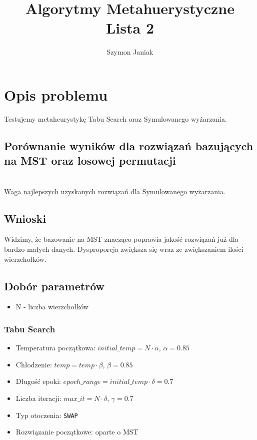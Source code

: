\documentclass{article}
\title{%
	Algorytmy Metahuerystyczne \\
	\large Lista 2}
\author{Szymon Janiak}
\begin{document}
\maketitle

\section*{Opis problemu}
	Testujemy metaheurystykę Tabu Search oraz Symulowanego wyżarzania.

\subsection*{Porównanie wyników dla rozwiązań bazujących na MST oraz losowej permutacji}
    \begin{center}
		\\Waga najlepszych uzyskanych rozwiązań dla Symulowanego wyżarzania.
    \end{center}
\subsection*{Wnioski}
	Widzimy, że bazowanie na MST znacząco poprawia jakość rozwiązań już dla bardzo małych danych. Dysproporcja zwiększa się wraz ze zwiększaniem ilości wierzchołków.

\subsection*{Dobór parametrów}
	\begin{itemize}
		\item N - liczba wierzchołków
	\end{itemize}
\subsubsection*{Tabu Search}
	\begin{itemize}
		\item Temperatura początkowa: $initial\_temp = N \cdot \alpha$, $\alpha = 0.85$
		\item Chłodzenie: $temp = temp \cdot \beta $, $\beta = 0.85$
		\item Długość epoki: $epoch\_range = initial\_temp \cdot \delta = 0.7$
		\item Liczba iteracji: $max\_it = N \cdot \delta$, $\gamma = 0.7$
		\item Typ otoczenia: \texttt{SWAP}
		\item Rozwiązanie początkowe: oparte o MST
	\end{itemize}
\end{document}
